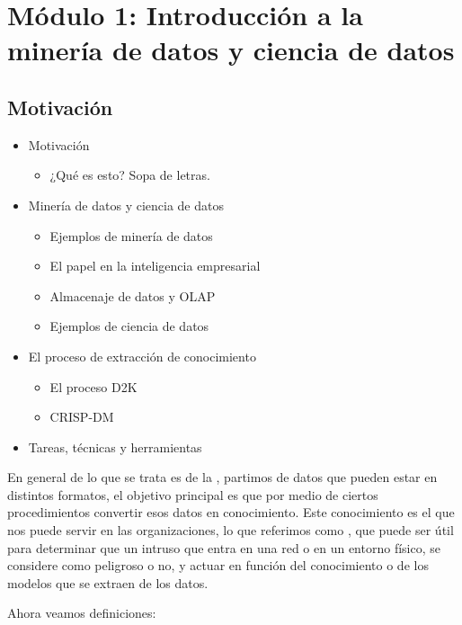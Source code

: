 \chapter{Módulo 1: Introducción a la minería de datos y ciencia de datos}

\section{Motivación}

\begin{itemize}
    \item Motivación 
    \begin{itemize}
        \item ¿Qué es esto? Sopa de letras.
    \end{itemize}
    \item Minería de datos y ciencia de datos 
    \begin{itemize}
        \item Ejemplos de minería de datos
        \item El papel en la inteligencia empresarial
        \item Almacenaje de datos y OLAP
        \item Ejemplos de ciencia de datos
    \end{itemize}
    \item El proceso de extracción de conocimiento
    \begin{itemize}
        \item El proceso D2K
        \item CRISP-DM
    \end{itemize}
    \item Tareas, técnicas y herramientas
\end{itemize}

En general de lo que se trata es de la , partimos de datos que pueden estar en distintos formatos, el objetivo principal es que por medio de ciertos procedimientos convertir esos datos en conocimiento. Este conocimiento es el que nos puede servir en las organizaciones, lo que referimos como , que puede ser útil para determinar que un intruso que entra en una red o en un entorno físico, se considere como peligroso o no, y actuar en función del conocimiento o de los modelos que se extraen de los datos.

Ahora veamos definiciones:

